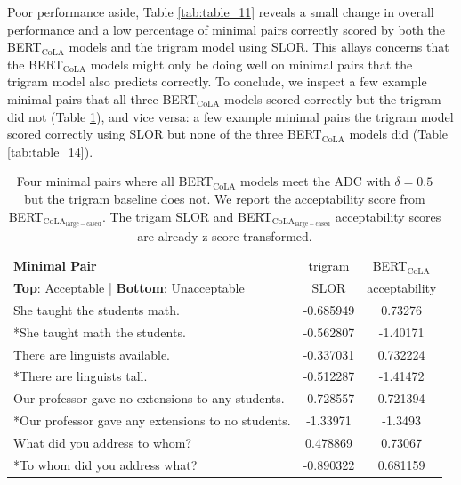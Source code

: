 Poor performance aside, Table \ref{tab:table_11} reveals a small change in overall performance and a low percentage of minimal pairs correctly scored by both the BERT$_\mathrm{CoLA}$ models and the trigram model using SLOR.  This allays concerns that the BERT$_\mathrm{CoLA}$ models might only be doing well on minimal pairs that the trigram model also predicts correctly.  To conclude, we inspect a few example minimal pairs that all three BERT$_\mathrm{CoLA}$ models scored correctly but the trigram did not (Table \ref{tab:table_13}), and vice versa: a few example minimal pairs the trigram model scored correctly using SLOR but none of the three BERT$_\mathrm{CoLA}$ models did (Table \ref{tab:table_14}).

\begin{table}[h]
    \centering
    \begin{tabular}{@{}lcc@{}}
    \toprule
    \textbf{Minimal Pair}                                    & trigram   & BERT$_\mathrm{CoLA}$\\
    \textbf{Top}: Acceptable | \textbf{Bottom}: Unacceptable & SLOR      & acceptability\\
    \toprule
    She taught the students math.  & -0.685949 & 0.73276 \\
    *She taught math the students. & -0.562807 & -1.40171 \\
    \midrule
    There are linguists available. & -0.337031 & 0.732224 \\
    *There are linguists tall.     &  -0.512287 & -1.41472 \\
    \midrule
    Our professor gave no extensions to any students. & -0.728557 & 0.721394 \\
    *Our professor gave any extensions to no students.  & -1.33971 & -1.3493 \\
    \midrule
    What did you address to whom?  & 0.478869 & 0.73067 \\
    *To whom did you address what? & -0.890322 & 0.681159 \\
    \bottomrule
    \end{tabular}
    \caption[Four minimal pairs where BERT$_\mathrm{CoLA}$ meets ADC\newline with $\delta=0.5$ but not the trigram model]{Four minimal pairs where all BERT$_\mathrm{CoLA}$ models meet the ADC with $\delta=0.5$ but the trigram baseline does not. We report the acceptability score from BERT$_\mathrm{CoLA_{large-cased}}$. The trigam SLOR and BERT$_\mathrm{CoLA_{large-cased}}$ acceptability scores are already z-score transformed. }
    \label{tab:table_13}
\end{table}

